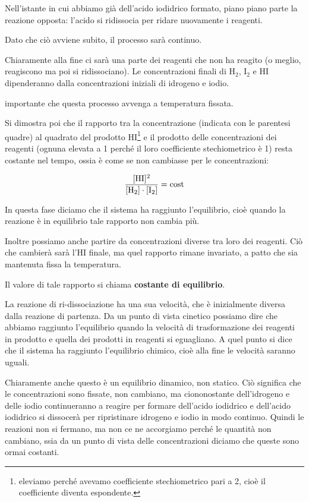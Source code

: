 Nell'istante in cui abbiamo già dell'acido iodidrico formato, piano piano parte la reazione opposta: l'acido si ridissocia per ridare nuovamente i reagenti.

Dato che ciò avviene subito, il processo sarà continuo.

Chiaramente alla fine ci sarà una parte dei reagenti che non ha reagito (o meglio, reagiscono ma poi si ridissociano). Le concentrazioni finali di H$_2$, I$_2$ e HI dipenderanno dalla concentrazioni iniziali di idrogeno e iodio.

\E importante che questa processo avvenga a temperatura fissata.

Si dimostra poi che il rapporto tra la concentrazione (indicata con le parentesi quadre) al quadrato del prodotto HI\footnote{eleviamo perché avevamo coefficiente stechiometrico pari a 2, cioè il coefficiente diventa espondente.} e il prodotto delle concentrazioni dei reagenti (ognuna elevata a 1 perché il loro coefficiente stechiometrico è 1) resta costante nel tempo, ossia è come se non cambiasse per le concentrazioni:

$$\rm \frac{[HI]^2}{[H_2] \cdot [I_2]}=cost$$

In questa fase diciamo che il sistema ha raggiunto l'equilibrio, cioè quando la reazione è in equilibrio tale rapporto non cambia più.

Inoltre possiamo anche partire da concentrazioni diverse tra loro dei reagenti. Ciò che cambierà sarà l'HI finale, ma quel rapporto rimane invariato, a patto che sia mantenuta fissa la temperatura.

Il valore di tale rapporto si chiama \textbf{costante di equilibrio}.

La reazione di ri-dissociazione ha una sua velocità, che è inizialmente diversa dalla reazione di partenza. Da un punto di vista cinetico possiamo dire che abbiamo raggiunto l'equilibrio quando la velocità di trasformazione dei reagenti in prodotto e quella dei prodotti in reagenti si eguagliano. A quel punto si dice che il sistema ha raggiunto l'equilibrio chimico, cioè alla fine le velocità saranno uguali.

Chiaramente anche questo è un equilibrio dinamico, non statico. Ciò significa che le concentrazioni sono fissate, non cambiano, ma ciononostante dell'idrogeno e delle iodio continueranno a reagire per formare dell'acido iodidrico e dell'acido iodidrico si dissocerà per ripristinare idrogeno e iodio in modo continuo. Quindi le reazioni non si fermano, ma non ce ne accorgiamo perché le quantità non cambiano, ssia da un punto di vista delle concentrazioni diciamo che queste sono ormai costanti.

